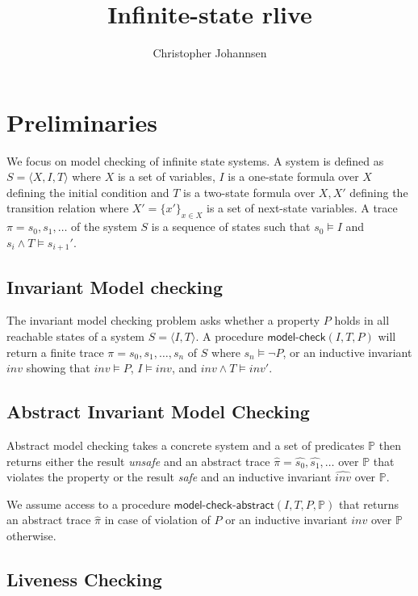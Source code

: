 \documentclass{article}
\newcommand{\mc}{\textsf{model-check}}
\newcommand{\abs}[1]{\ensuremath{\widehat{#1}}}
\newcommand{\preds}{\ensuremath{\mathbb{P}}}
\newcommand{\mcabs}{\textsf{model-check-abstract}}
\begin{document}
\title{Infinite-state rlive}
\author{Christopher Johannsen}
\maketitle

\section{Preliminaries}

We focus on model checking of infinite state systems. A system is defined as $S = \langle X,I,T
\rangle$ where $X$ is a set of variables, $I$ is a one-state formula over $X$ defining the initial
condition and $T$ is a two-state formula over $X,X'$ defining the transition relation where $X' =
\{x'\}_{x \in X}$ is a set of next-state variables. A trace $\pi = s_0,s_1,\dots$ of the system $S$
is a sequence of states such that $s_0 \models I$ and $s_i \land T \models s_{i+1}'$. 

\subsection{Invariant Model checking}

The invariant model checking problem asks whether a property $P$ holds in all reachable states of a
system $S = \langle I,T \rangle$. A procedure $\mc(I,T,P)$ will return a finite trace $\pi =
s_0,s_1,\dots,s_n$ of $S$ where $s_n \models \neg P$, or an inductive invariant $inv$ showing that
$inv \models P$, $I \models inv$, and $inv \land T \models inv'$.

\subsection{Abstract Invariant Model Checking}

Abstract model checking takes a concrete system and a set of predicates \preds{} then returns either
the result \emph{unsafe} and an abstract trace $\abs{\pi} = \abs{s_0},\abs{s_1},\dots$ over \preds{}
that violates the property or the result \emph{safe} and an inductive invariant $\abs{inv}$ over
\preds.

We assume access to a procedure $\mcabs(I,T,P,\preds)$ that returns an abstract trace $\abs{\pi}$ in
case of violation of $P$ or an inductive invariant $inv$ over \preds{} otherwise. 

\subsection{Liveness Checking}
\end{document}
